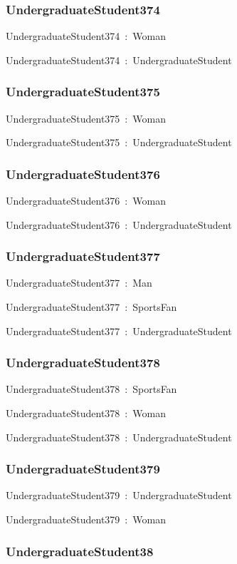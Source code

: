 \documentclass{article}
\begin{document}
\subsubsection*{UndergraduateStudent374}

UndergraduateStudent374~:~Woman

UndergraduateStudent374~:~UndergraduateStudent

\subsubsection*{UndergraduateStudent375}

UndergraduateStudent375~:~Woman

UndergraduateStudent375~:~UndergraduateStudent

\subsubsection*{UndergraduateStudent376}

UndergraduateStudent376~:~Woman

UndergraduateStudent376~:~UndergraduateStudent

\subsubsection*{UndergraduateStudent377}

UndergraduateStudent377~:~Man

UndergraduateStudent377~:~SportsFan

UndergraduateStudent377~:~UndergraduateStudent

\subsubsection*{UndergraduateStudent378}

UndergraduateStudent378~:~SportsFan

UndergraduateStudent378~:~Woman

UndergraduateStudent378~:~UndergraduateStudent

\subsubsection*{UndergraduateStudent379}

UndergraduateStudent379~:~UndergraduateStudent

UndergraduateStudent379~:~Woman

\subsubsection*{UndergraduateStudent38}
\end{document}
